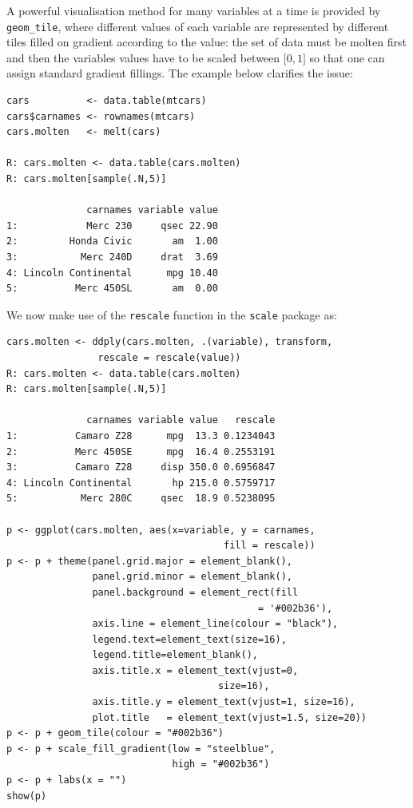 A powerful visualisation method for many variables
at a time is provided by \texttt{geom\_tile}, where different
values of each variable are represented by different tiles
filled on gradient according to the value: the set 
of data must be molten first and then the variables values
have to be scaled between $\mathopen[0,1\mathclose]$ so 
that one can assign standard gradient fillings. The
example below clarifies the issue:
\begin{verbatim}
cars          <- data.table(mtcars)
cars$carnames <- rownames(mtcars)
cars.molten   <- melt(cars)

R: cars.molten <- data.table(cars.molten)
R: cars.molten[sample(.N,5)]

              carnames variable value
1:            Merc 230     qsec 22.90
2:         Honda Civic       am  1.00
3:           Merc 240D     drat  3.69
4: Lincoln Continental      mpg 10.40
5:          Merc 450SL       am  0.00
\end{verbatim}
We now make use of the \texttt{rescale} function
in the \texttt{scale} package as:
\begin{verbatim}
cars.molten <- ddply(cars.molten, .(variable), transform,
                rescale = rescale(value)) 
R: cars.molten <- data.table(cars.molten)
R: cars.molten[sample(.N,5)]

              carnames variable value   rescale
1:          Camaro Z28      mpg  13.3 0.1234043
2:          Merc 450SE      mpg  16.4 0.2553191
3:          Camaro Z28     disp 350.0 0.6956847
4: Lincoln Continental       hp 215.0 0.5759717
5:           Merc 280C     qsec  18.9 0.5238095

p <- ggplot(cars.molten, aes(x=variable, y = carnames, 
                                      fill = rescale))
p <- p + theme(panel.grid.major = element_blank(), 
               panel.grid.minor = element_blank(),
               panel.background = element_rect(fill 
                                            = '#002b36'),
               axis.line = element_line(colour = "black"),
               legend.text=element_text(size=16),
               legend.title=element_blank(),
               axis.title.x = element_text(vjust=0, 
                                     size=16),
               axis.title.y = element_text(vjust=1, size=16),
               plot.title   = element_text(vjust=1.5, size=20)) 
p <- p + geom_tile(colour = "#002b36")
p <- p + scale_fill_gradient(low = "steelblue", 
                             high = "#002b36")
p <- p + labs(x = "")
show(p)
\end{verbatim}

